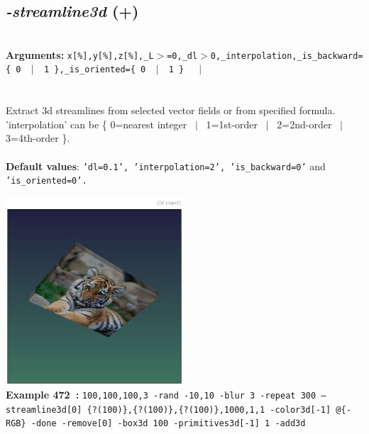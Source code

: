 \documentclass[a4paper,11pt,twoside]{book}
\begin{document}
\subsection{\emph{-streamline3d} (+)}\vspace*{-0.5em}
~\\\textbf{Arguments: } 
{\small \texttt{x[\%],y[\%],z[\%],\_L$>$=0,\_dl$>$0,\_interpolation,\_is\_backward=\{ 0 ~$|$~ 1 \},\_is\_oriented=\{ 0 ~$|$~ 1 \}}}~~~$|$\\
\\~\\
Extract 3d streamlines from selected vector fields or from specified formula.
~\\'interpolation' can be \{ 0=nearest integer ~$|$~ 1=1st-order ~$|$~ 2=2nd-order ~$|$~ 3=4th-order \}.
~\\~\\\textbf{Default values}: {\small \texttt{'dl=0.1', 'interpolation=2', 'is\_backward=0'} and \texttt{'is\_oriented=0'.}}
\begin{center}\includegraphics[keepaspectratio=true,height=7cm,width=\textwidth]{img/gmic_def472.jpg}\\
{\footnotesize \textbf{Example 472~:} \texttt{100,100,100,3 -rand -10,10 -blur 3 -repeat 300 --streamline3d[0] \{?(100)\},\{?(100)\},\{?(100)\},1000,1,1 -color3d[-1] @\{-RGB\} -done -remove[0] -box3d 100 -primitives3d[-1] 1 -add3d}}
\end{center}
\end{document}
